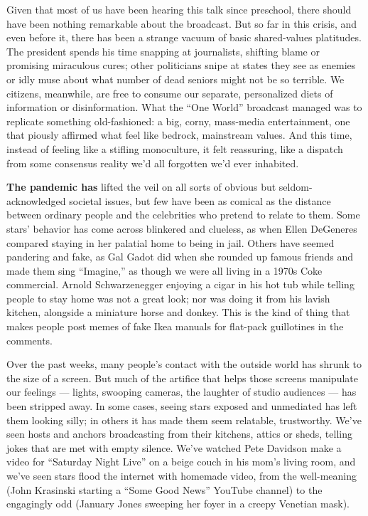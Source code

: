 Given that most of us have been hearing this talk since preschool, there
should have been nothing remarkable about the broadcast. But so far in
this crisis, and even before it, there has been a strange vacuum of
basic shared-values platitudes. The president spends his time snapping
at journalists, shifting blame or promising miraculous cures; other
politicians snipe at states they see as enemies or idly muse about what
number of dead seniors might not be so terrible. We citizens, meanwhile,
are free to consume our separate, personalized diets of information or
disinformation. What the ``One World'' broadcast managed was to
replicate something old-fashioned: a big, corny, mass-media
entertainment, one that piously affirmed what feel like bedrock,
mainstream values. And this time, instead of feeling like a stifling
monoculture, it felt reassuring, like a dispatch from some consensus
reality we'd all forgotten we'd ever inhabited.

\textbf{The pandemic has} lifted the veil on all sorts of obvious but
seldom-acknowledged societal issues, but few have been as comical as the
distance between ordinary people and the celebrities who pretend to
relate to them. Some stars' behavior has come across blinkered and
clueless, as when Ellen DeGeneres compared staying in her palatial home
to being in jail. Others have seemed pandering and fake, as Gal Gadot
did when she rounded up famous friends and made them sing ``Imagine,''
as though we were all living in a 1970s Coke commercial. Arnold
Schwarzenegger enjoying a cigar in his hot tub while telling people to
stay home was not a great look; nor was doing it from his lavish
kitchen, alongside a miniature horse and donkey. This is the kind of
thing that makes people post memes of fake Ikea manuals for flat-pack
guillotines in the comments.

Over the past weeks, many people's contact with the outside world has
shrunk to the size of a screen. But much of the artifice that helps
those screens manipulate our feelings --- lights, swooping cameras, the
laughter of studio audiences --- has been stripped away. In some cases,
seeing stars exposed and unmediated has left them looking silly; in
others it has made them seem relatable, trustworthy. We've seen hosts
and anchors broadcasting from their kitchens, attics or sheds, telling
jokes that are met with empty silence. We've watched Pete Davidson make
a video for ``Saturday Night Live'' on a beige couch in his mom's living
room, and we've seen stars flood the internet with homemade video, from
the well-meaning (John Krasinski starting a ``Some Good News'' YouTube
channel) to the engagingly odd (January Jones sweeping her foyer in a
creepy Venetian mask).


